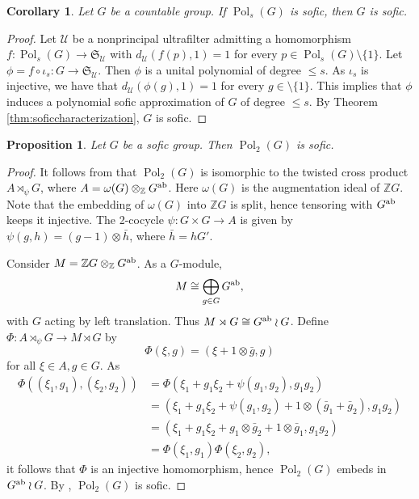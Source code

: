 \documentclass[a4paper,12pt]{amsart}
\theoremstyle{plain}
\newtheorem{corollary}[subsection]{{\bf Corollary}}
\newtheorem{proposition}[subsection]{{\bf Proposition}}
\theoremstyle{definition}
\theoremstyle{remark}
\numberwithin{equation}{subsection}
\DeclareMathOperator{\Pold}{Pol}
\begin{document}
\begin{corollary}
    \label{cor:soficG}
    Let $G$ be a countable group. If $\Pold_s(G)$ is sofic, then $G$ is sofic.
\end{corollary}

\begin{proof}
    Let $\mathcal{U}$ be a nonprincipal ultrafilter admitting a homomorphism $f:\Pold_s(G)\to\mathfrak{S}_{\mathcal{U}}$ with $d_{\mathcal{U}}(f(p),1)=1$ for every $p\in\Pold_s(G)\setminus\{1\}$. Let $\phi=f\circ\iota_s:G\to\mathfrak{S}_{\mathcal{U}}$. Then $\phi$ is a unital polynomial of degree $\le s$. As $\iota_s$ is injective, we have that $d_{\mathcal{U}}(\phi(g),1)=1$ for every $g\in\setminus\{1\}$. This implies that $\phi$ induces a polynomial sofic approximation of $G$ of degree $\le s$. By Theorem \ref{thm:soficcharacterization}, $G$ is sofic.
\end{proof}

\begin{proposition}
    \label{prop:soficPol2}
    Let $G$ be a sofic group. Then $\Pold_2(G)$ is sofic.
\end{proposition}

\begin{proof}
    It follows from \cite[Theorem 1.3]{JT24} that $\Pold_2(G)$ is isomorphic to the twisted cross product $A\rtimes_\psi G$, where $A=\omega(G)\otimes_\mathbb{Z} G^{\rm ab}$. Here $\omega(G)$ is the augmentation ideal of $\mathbb{Z}G$. Note that the embedding of $\omega(G)$ into $\mathbb{Z}G$ is split, hence tensoring with $G^{\rm ab}$ keeps it injective.
    The 2-cocycle $\psi:G\times G\to A$ is given by $\psi(g,h)=(g-1)\otimes \bar{h}$, where $\bar{h}=hG'$.

    Consider $M=\mathbb{Z}G\otimes_\mathbb{Z} G^{\rm ab}$. As a $G$-module,
    $$M\cong \bigoplus_{g\in G} G^{\rm ab},$$
    with $G$ acting by left translation. Thus $M\rtimes G\cong G^{\rm ab}\wr G$. Define $\Phi:A\rtimes_\psi G\to M\rtimes G$ by
    $$\Phi(\xi,g)=(\xi+1\otimes \bar{g},g)$$
    for all $\xi\in A, g\in G$. As
    \begin{align*}
        \Phi((\xi_1,g_1),(\xi_2,g_2)) &= 
        \Phi(\xi_1+g_1\xi_2+\psi(g_1,g_2),g_1g_2)\\
        &= (\xi_1+g_1\xi_2+\psi(g_1,g_2)+1\otimes (\bar{g}_1+\bar{g}_2),g_1g_2)\\
        &= (\xi_1+g_1\xi_2+g_1\otimes \bar{g}_2+1\otimes \bar{g}_1,g_1g_2)\\
        &=\Phi(\xi_1,g_1)\Phi(\xi_2,g_2),
    \end{align*}
    it follows that $\Phi$ is an injective homomorphism, hence $\Pold_2(G)$ embeds in $G^{\rm ab}\wr G$. By \cite[Theorem 1.1]{HS18}, $\Pold_2(G)$ is sofic.
\end{proof}
\end{document}
